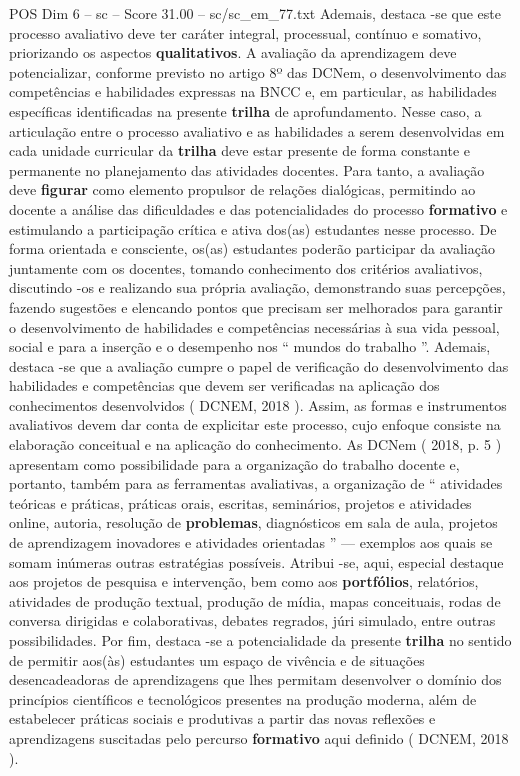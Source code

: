 \begin{textsample}{POS Dim 6 – sc – Score 31.00 – sc/sc\_em\_77.txt}
Ademais, destaca -se que este processo avaliativo deve ter caráter integral, processual, contínuo e somativo, priorizando os aspectos \textbf{qualitativos}.
A avaliação da aprendizagem deve potencializar, conforme previsto no artigo 8º das DCNem, o desenvolvimento das competências e habilidades expressas na BNCC e, em particular, as habilidades específicas identificadas na presente \textbf{trilha} de aprofundamento.
Nesse caso, a articulação entre o processo avaliativo e as habilidades a serem desenvolvidas em cada unidade curricular da \textbf{trilha} deve estar presente de forma constante e permanente no planejamento das atividades docentes.
Para tanto, a avaliação deve \textbf{figurar} como elemento propulsor de relações dialógicas, permitindo ao docente a análise das dificuldades e das potencialidades do processo \textbf{formativo} e estimulando a participação crítica e ativa dos(as) estudantes nesse processo.
De forma orientada e consciente, os(as) estudantes poderão participar da avaliação juntamente com os docentes, tomando conhecimento dos critérios avaliativos, discutindo -os e realizando sua própria avaliação, demonstrando suas percepções, fazendo sugestões e elencando pontos que precisam ser melhorados para garantir o desenvolvimento de habilidades e competências necessárias à sua vida pessoal, social e para a inserção e o desempenho nos “ mundos do trabalho ”.
Ademais, destaca -se que a avaliação cumpre o papel de verificação do desenvolvimento das habilidades e competências que devem ser verificadas na aplicação dos conhecimentos desenvolvidos ( DCNEM, 2018 ).
Assim, as formas e instrumentos avaliativos devem dar conta de explicitar este processo, cujo enfoque consiste na elaboração conceitual e na aplicação do conhecimento.
As DCNem ( 2018, p. 5 ) apresentam como possibilidade para a organização do trabalho docente e, portanto, também para as ferramentas avaliativas, a organização de “ atividades teóricas e práticas, práticas orais, escritas, seminários, projetos e atividades online, autoria, resolução de \textbf{problemas}, diagnósticos em sala de aula, projetos de aprendizagem inovadores e atividades orientadas ” — exemplos aos quais se somam inúmeras outras estratégias possíveis.
Atribui -se, aqui, especial destaque aos projetos de pesquisa e intervenção, bem como aos \textbf{portfólios}, relatórios, atividades de produção textual, produção de mídia, mapas conceituais, rodas de conversa dirigidas e colaborativas, debates regrados, júri simulado, entre outras possibilidades.
Por fim, destaca -se a potencialidade da presente \textbf{trilha} no sentido de permitir aos(às) estudantes um espaço de vivência e de situações desencadeadoras de aprendizagens que lhes permitam desenvolver o domínio dos princípios científicos e tecnológicos presentes na produção moderna, além de estabelecer práticas sociais e produtivas a partir das novas reflexões e aprendizagens suscitadas pelo percurso \textbf{formativo} aqui definido ( DCNEM, 2018 ).

\end{textsample}
